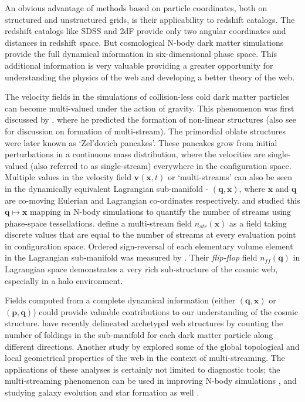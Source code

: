 An obvious advantage of methods based on particle coordinates, both on structured and unstructured grids, is their applicability to redshift catalogs. The redshift catalogs like SDSS and 2dF provide only two angular coordinates and distances in redshift space. But cosmological N-body dark matter simulations provide the full dynamical information in six-dimensional phase space. This additional information is very valuable providing a greater opportunity for understanding the physics of the web and developing a better theory of the web.


The velocity fields in the simulations of collision-less cold dark matter particles can become multi-valued under the action of gravity. This phenomenon was first discussed by \cite{Zeldovich1970}, where he predicted the formation of non-linear structures (also see \citealt{Shandarin1989} for discussion on formation of multi-stream). The primordial oblate structures were later known as `Zel'dovich pancakes'. These pancakes grow from initial perturbations in a continuous mass distribution, where the velocities are single-valued (also referred to as single-stream) everywhere in the configuration space. Multiple values in the velocity field $\mathbf{v} (\mathbf{x},t)$ or `multi-streams' can also be seen in the dynamically equivalent Lagrangian sub-manifold - $(\mathbf{q}, \mathbf{x})$, where $\mathbf{x}$ and $\mathbf{q}$ are co-moving Eulerian and Lagrangian co-ordinates respectively. \cite{Shandarin2011} and \cite{Abel2012} studied this $ \mathbf{q} \mapsto \mathbf{x}$ mapping in N-body simulations to quantify the number of streams using phase-space tessellations. \cite{Shandarin2011} define a multi-stream field $n_{str}(\mathbf{x})$ as a field taking discrete values that are equal to the number of streams at every evaluation point in configuration space. Ordered sign-reversal of each elementary volume element in the Lagrangian sub-manifold was measured by \cite{Shandarin2014a}. Their {\it flip-flop} field $n_{ff}(\mathbf{q})$ in Lagrangian space demonstrates a very rich sub-structure of the cosmic web, especially in a halo environment. 

Fields computed from a complete dynamical information (either $(\mathbf{q}, \mathbf{x})$ or $(\mathbf{p}, \mathbf{q})$) could provide valuable contributions to our understanding of the cosmic structure. \cite{Falck2012} have recently delineated archetypal web structures by counting the number of foldings in the sub-manifold for each dark matter particle along different directions. Another study by \cite{Ramachandra2016a} explored some of the global topological and local geometrical properties of the web in the context of multi-streaming. The applications of these analyses is certainly not limited to diagnostic tools; the multi-streaming phenomenon can be used in improving N-body simulations \citep{Hahn2013}, and studying galaxy evolution and star formation as well \citep{Aragon-Calvo2016}. 



